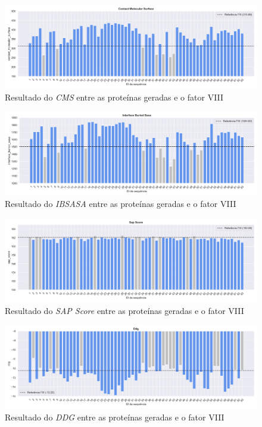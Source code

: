 \begin{figure}[H]
    \centering
    \includegraphics[width=.9\linewidth]{figuras/plot_contact_molecular_surface.png}    
    \caption{Resultado do \textit{CMS} entre as proteínas geradas e o fator VIII}
\end{figure}

\begin{figure}[H]
    \centering
    \includegraphics[width=.9\linewidth]{figuras/plot_interface_buried_sasa.png}    
    \caption{Resultado do \textit{IBSASA} entre as proteínas geradas e o fator VIII}
\end{figure}

\begin{figure}[H]
    \centering
    \includegraphics[width=.9\linewidth]{figuras/plot_sap_score.png}    
    \caption{Resultado do \textit{SAP Score} entre as proteínas geradas e o fator VIII}
\end{figure}

\begin{figure}[H]
    \centering
    \includegraphics[width=.9\linewidth]{figuras/plot_ddg.png}    
    \caption{Resultado do \textit{DDG} entre as proteínas geradas e o fator VIII}
\end{figure}









